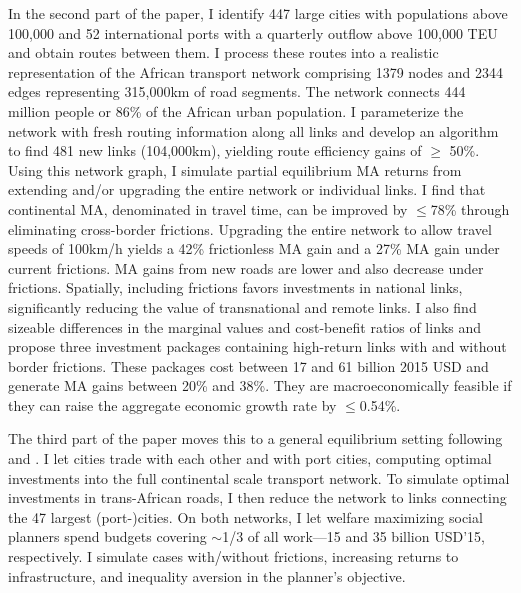 \documentclass[a4paper]{article}
\begin{document}
In the second part of the paper, I identify 447 large cities with populations above 100,000 and 52 international ports with a quarterly outflow above 100,000 TEU and obtain routes between them. I process these routes into a realistic representation of the African transport network comprising 1379 nodes and 2344 edges representing 315,000km of road segments. The network connects 444 million people or 86\% of the African urban population. I parameterize the network with fresh routing information along all links and develop an algorithm to find 481 new links (104,000km), yielding route efficiency gains of $\geq$ 50\%. Using this network graph, I simulate partial equilibrium MA returns from extending and/or upgrading the entire network or individual links. I find that continental MA, denominated in travel time, can be improved by $\leq$78\% through eliminating cross-border frictions. Upgrading the entire network to allow travel speeds of 100km/h yields a 42\% frictionless MA gain and a 27\% MA gain under current frictions. MA gains from new roads are lower and also decrease under frictions. Spatially, including frictions favors investments in national links, significantly reducing the value of transnational and remote links. I also find sizeable differences in the marginal values and cost-benefit ratios of links and propose three investment packages containing high-return links with and without border frictions. These packages cost between 17 and 61 billion 2015 USD and generate MA gains between 20\% and 38\%. They are macroeconomically feasible if they can raise the aggregate economic growth rate by $\leq$0.54\%. \newline 


The third part of the paper moves this to a general equilibrium setting following \citet{fajgelbaum2020optimal} and \citet{graff2019spatial}. I let cities trade with each other and with port cities, computing optimal investments into the full continental scale transport network. To simulate optimal investments in trans-African roads, I then reduce the network to links connecting the 47 largest (port-)cities. On both networks, I let welfare maximizing social planners spend budgets covering $\sim$1/3 of all work---15 and 35 billion USD'15, respectively. I simulate cases with/without frictions, increasing returns to infrastructure, and inequality aversion in the planner's objective. \newline  
\end{document}

